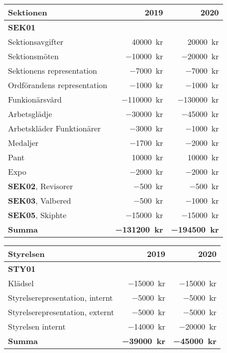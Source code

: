 \documentclass[10pt]{article}
\begin{document}
    \section*{\doctitle}
    \begin{tabularx}{10cm}{X r r}
        \textbf{\large Sektionen} & \textbf{2019} & \textbf{2020} \\
        \hline
        \textbf{SEK01} \\
        Sektionsavgifter & \SI{40000}{kr} & \SI{20000}{kr} \\
        Sektionsmöten & \SI{-10000}{kr} & \SI{-20000}{kr} \\
        Sektionens representation & \SI{-7000}{kr} & \SI{-7000}{kr} \\
        Ordförandens representation & \SI{-1000}{kr} & \SI{-1000}{kr} \\
        Funkionärsvård & \SI{-110000}{kr} & \SI{-130000}{kr} \\
        Arbetsglädje & \SI{-30000}{kr} & \SI{-45000}{kr} \\
        Arbetskläder Funktionärer & \SI{-3000}{kr} & \SI{-1000}{kr} \\
        Medaljer & \SI{-1700}{kr} & \SI{-2000}{kr} \\
        Pant & \SI{10000}{kr} & \SI{10000}{kr} \\
        Expo & \SI{-2000}{kr} & \SI{-2000}{kr} \\
        \textbf{SEK02}, Revisorer & \SI{-500}{kr} & \SI{-500}{kr} \\
        \textbf{SEK03}, Valbered & \SI{-500}{kr} & \SI{-1000}{kr} \\
        \textbf{SEK05}, Skiphte & \SI{-15000}{kr} & \SI{-15000}{kr} \\
        \hline
        \textbf{Summa} & \textbf{\SI{-131200}{kr}} & \textbf{\SI{-194500}{kr}} \\
    \end{tabularx}
    
    \begin{tabularx}{10cm}{X r r}
        \textbf{\large Styrelsen} & \textbf{2019} & \textbf{2020} \\
        \hline
        \textbf{STY01} \\
        Klädsel & \SI{-15000}{kr} & \SI{-15000}{kr} \\
        Styrelserepresentation, internt & \SI{-5000}{kr} & \SI{-5000}{kr} \\
        Styrelserepresentation, externt & \SI{-5000}{kr} & \SI{-5000}{kr} \\
        Styrelsen internt & \SI{-14000}{kr} & \SI{-20000}{kr} \\
        \hline
        \textbf{Summa} & \textbf{\SI{-39000}{kr}} & \textbf{\SI{-45000}{kr}} \\
    \end{tabularx}
    
\end{document}
